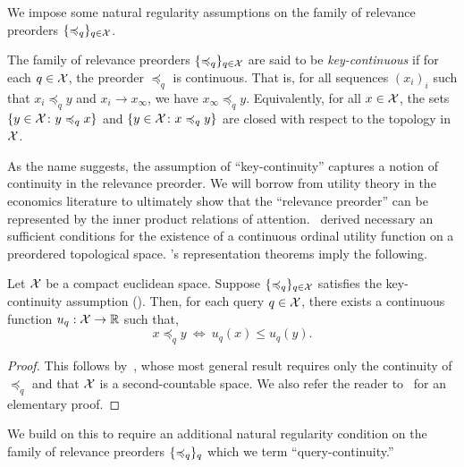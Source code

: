 We impose some natural regularity assumptions on the family of relevance preorders $\{\preccurlyeq_q\}_{q \in {\mathcal{X}}}$.
\begin{assumption}\label{ass:key_cts}
    The family of relevance preorders $\{\preccurlyeq_q\}_{q \in {\mathcal{X}}}$ are said to be \textit{key-continuous} if for each $q \in {\mathcal{X}}$, the preorder $\preceq_q$ is continuous. That is, for all sequences $(x_i)_i$ such that $x_i \preceq_q y$ and $x_i \to x_\infty$, we have $x_\infty \preceq_q y$. Equivalently, for all $x \in {\mathcal{X}}$, the sets $\{y \in {\mathcal{X}} \colon y \preccurlyeq_q x\}$ and $\{y \in {\mathcal{X}} \colon x \preccurlyeq_q y\}$ are closed with respect to the topology in ${\mathcal{X}}$.
\end{assumption}

As the name suggests, the assumption of ``key-continuity'' captures a notion of continuity in the relevance preorder. We will borrow from utility theory in the economics literature to ultimately show that the ``relevance preorder'' can be represented by the inner product relations of attention.~\citet{debreuRepresentationPreferenceOrdering1954} derived necessary an sufficient conditions for the existence of a continuous ordinal utility function on a preordered topological space. 's representation theorems imply the following.

\begin{theorem*}
    Let ${\mathcal{X}}$ be a compact euclidean space. Suppose $\{\preccurlyeq_q\}_{q \in {\mathcal{X}}}$ satisfies the key-continuity assumption (). Then, for each query $q \in {\mathcal{X}}$, there exists a continuous function $u_q: {\mathcal{X}} \to \mathbb{R}$ such that,
    \begin{equation*}
        x \preceq_q y \ \iff \ u_q(x) \leq u_q(y).
    \end{equation*}
\end{theorem*}
\begin{proof}
    This follows by~\parencite{debreuRepresentationPreferenceOrdering1954}, whose most general result requires only the continuity of $\preceq_q$ and that ${\mathcal{X}}$ is a second-countable space. We also refer the reader to~\parencite{jaffrayExistenceContinuousUtility1975} for an elementary proof.
\end{proof}

We build on this to require an additional natural regularity condition on the family of relevance preorders $\{\preccurlyeq_q\}_{q}$ which we term ``query-continuity.''

